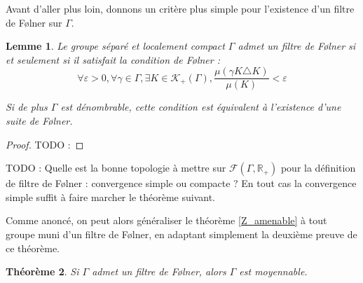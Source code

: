\documentclass[a4paper,12pt]{article}
\newtheorem{theorem}{Théorème}[section]
\newtheorem{lemma}[theorem]{Lemme}
\newcommand{\R}{\mathbb{R}}
\newcommand{\ssi}{si et seulement si }
\newcommand{\TODO}[1]{{\color{red}TODO :} #1}
\begin{document}
Avant d'aller plus loin, donnons un critère plus simple pour l'existence d'un filtre de F\o{}lner sur $\Gamma$.

\begin{lemma}
    Le groupe séparé et localement compact $\Gamma$ admet un filtre de F\o{}lner \ssi il satisfait la 
    \emph{condition de F\o{}lner} :
    \begin{equation}\label{Folner_cond}
        \forall\varepsilon>0, \forall \gamma\in\Gamma, \exists K\in\mathcal{K}_+(\Gamma), 
        \frac{\mu(\gamma K\triangle K)}{\mu(K)}<\varepsilon
    \end{equation}

    Si de plus $\Gamma$ est dénombrable, cette condition est équivalent à l'existence d'une suite de F\o{}lner.
\end{lemma}

\begin{proof}
    \TODO{}
\end{proof}

\TODO{Quelle est la bonne topologie à mettre sur $\mathcal{F}(\Gamma, \R_+)$ pour la définition de filtre de F\o{}lner : convergence simple ou compacte ?
    En tout cas la convergence simple suffit à faire marcher le théorème suivant.}

Comme anoncé, on peut alors généraliser le théorème \ref{Z_amenable} à tout groupe muni d'un filtre de F\o{}lner,
en adaptant simplement la deuxième preuve de ce théorème.

\begin{theorem}\label{amenable_of_Folner}
    Si $\Gamma$ admet un filtre de F\o{}lner, alors $\Gamma$ est moyennable.
\end{theorem}
\end{document}
